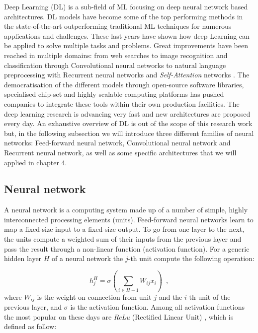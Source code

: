 Deep Learning (DL) is a sub-field of ML focusing on deep neural network based architectures. DL models have become some of the top performing methods in the state-of-the-art outperforming traditional ML techniques for numerous applications and challenges. These last years have shown how deep Learning can be applied to solve multiple tasks and problems. Great improvements have been reached in multiple domains: from web searches to image recognition and classification through Convolutional neural networks to natural language preprocessing with Recurrent neural networks and \textit{Self-Attention} networks \citep{vaswani2017attention}. The democratisation of the different models through open-source software libraries, specialised chip-set and highly scalable computing platforms has pushed companies to integrate these tools within their own production facilities. The deep learning research is advancing very fast and new architectures are proposed every day. An exhaustive overview of DL is out of the scope of this research work but, in the following subsection we will introduce three different families of neural networks: Feed-forward neural network, Convolutional neural network and Recurrent neural network, as well as some specific architectures that we will applied in chapter 4.


\subsection{Neural network}

A neural network is a computing system made up of a number of simple, highly interconnected processing elements (units). Feed-forward neural networks learn to map a fixed-size input to a fixed-size output. To go from one layer to the next, the units compute a weighted sum of their inputs from the previous layer and pass the result through a non-linear function (activation function). For a generic hidden layer $H$ of a neural network the $j$-th unit compute the following operation:  

\begin{equation}
    h_j^H = \sigma(\sum_{i \in H-1}W_{ij}x_i)
    \enspace,
\end{equation}
where $W_{ij}$ is the weight on connection from unit $j$ and the $i$-th unit of the previous layer, and $\sigma$ is the activation function. Among all activation functions the most popular on these days are \textit{ReLu} (Rectified Linear Unit) \citep{Glorot2011DeepSR}, which is defined as follow:


